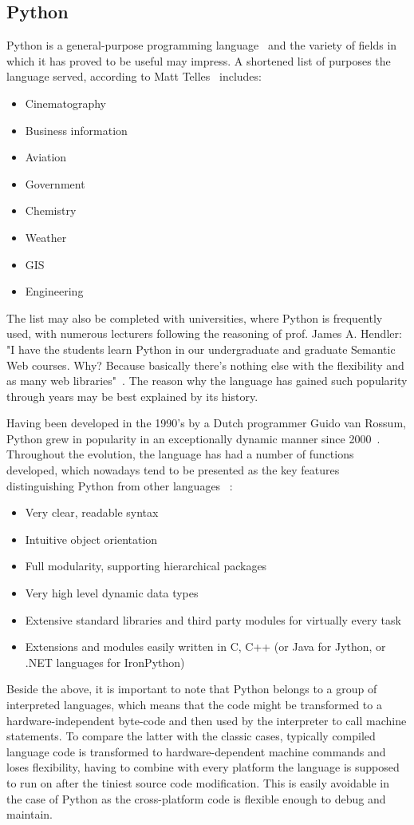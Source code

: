 \subsection{Python}\label{subsec:py}
Python is a general-purpose programming language~\cite[page 3]{py_nutshell} and the variety of fields in which it has proved to be useful may impress. A shortened list of purposes the language served, according to Matt Telles~\cite[page 13]{py_power} includes:
\begin{itemize}
\item{Cinematography}
\item{Business information}
\item{Aviation}
\item{Government}
\item{Chemistry}
\item{Weather}
\item{GIS}
\item{Engineering}
\end{itemize}
The list may also be completed with universities, where Python is frequently used, with numerous lecturers following the reasoning of prof. James A. Hendler: "I have the students learn Python in our undergraduate and graduate Semantic Web courses. Why? Because basically there's nothing else with the flexibility and as many web libraries"~\cite{py_quote}. The reason why the language has gained such popularity through years may be best explained by its history.

Having been developed in the 1990's by a Dutch programmer Guido van Rossum, Python grew in popularity in an exceptionally dynamic manner since 2000~\cite{py_code_swarm}. Throughout the evolution, the language has had a number of functions developed, which nowadays tend to be presented as the key features distinguishing Python from other languages ~\cite{py_about}:
\begin{itemize}
\item{Very clear, readable syntax}
\item{Intuitive object orientation}
\item{Full modularity, supporting hierarchical packages}
\item{Very high level dynamic data types}
\item{Extensive standard libraries and third party modules for virtually every task}
\item{Extensions and modules easily written in C, C++ (or Java for Jython, or .NET languages for IronPython)}
\end{itemize}
Beside the above, it is important to note that Python belongs to a group of interpreted languages, which means that the code might be transformed to a hardware-independent byte-code and then used by the interpreter to call machine statements. To compare the latter with the classic cases, typically compiled language code is transformed to hardware-dependent machine commands and loses flexibility, having to combine with every platform the language is supposed to run on after the tiniest source code modification. This is easily avoidable in the case of Python as the cross-platform code is flexible enough to debug and maintain. 

